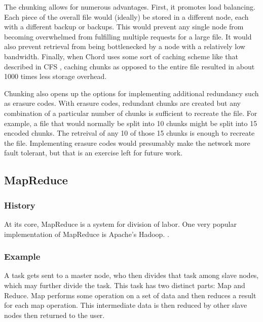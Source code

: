 \documentclass[conference, compsocconf, letterpaper]{IEEEtran}
\begin{document}
The chunking allows for numerous advantages.  First, it promotes load balancing. Each piece of the overall file would (ideally) be stored in a different node, each with a different backup or backups.  This would prevent any single node from becoming overwhelmed from fulfilling multiple requests for a large file.  It would also prevent retrieval from being bottlenecked by a node with a relatively low bandwidth. Finally, when Chord uses some sort of caching scheme like that described in CFS \cite{CFS}, caching chunks as opposed to the entire file resulted in about 1000 times less storage overhead.  


Chunking also opens up the options for implementing additional redundancy such as erasure codes\cite{rizzo1997effective}. With erasure codes, redundant chunks are created but any combination of a particular number of chunks is sufficient to recreate the file.  For example, a file that would normally be split into 10 chunks might be split into 15 encoded chunks.  The retreival of any 10 of those 15 chunks is enough to recreate the file.  Implementing erasure codes would presumably make the network more fault tolerant, but that is an exercise left for future work.





\subsection{MapReduce}
\subsubsection{History}

At its core, MapReduce \cite{mapreduce} is a system for division of labor.  One very popular implementation of MapReduce is  Apache's Hadoop. \cite{hadoop}.

\subsubsection{Example}

A task gets sent to a master node, who then divides that task among slave nodes, which may further divide the task.  This task has two distinct parts: Map and Reduce.  Map performs some operation on a set of data and then reduces a result for each map operation.  This intermediate data is then reduced by other slave nodes then returned to the user. 
\end{document}
